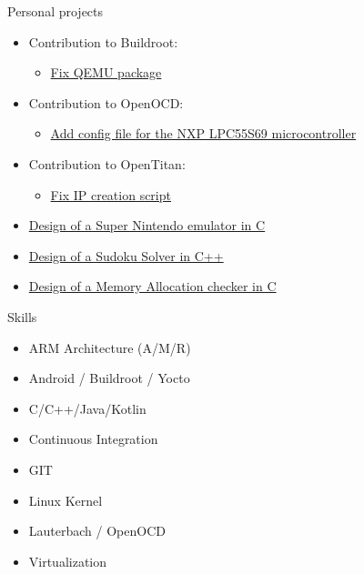 \documentclass[a4paper, 10pt]{article}
\begin{document}
\begin{unbreakableSection} {Personal projects}
\begin{projects}
\begin{itemize}[parsep=0cm,itemsep=0cm,topsep=0cm]
\begin{itemize}[parsep=0cm,itemsep=0cm,topsep=0cm]
			\end{itemize}
		\item Contribution to Buildroot:
			\begin{itemize}[parsep=0cm,itemsep=0cm,topsep=0cm]
				\item \href{https://git.busybox.net/buildroot/commit/?id=c2cdde4887500ca809ab52ff75d22afdb3c1168d}{Fix QEMU package}
			\end{itemize}
		\item Contribution to OpenOCD:
			\begin{itemize}[parsep=0cm,itemsep=0cm,topsep=0cm]
				\item \href{https://review.openocd.org/c/openocd/+/6787}{Add config file for the NXP LPC55S69 microcontroller}
			\end{itemize}
		\item Contribution to OpenTitan:
			\begin{itemize}[parsep=0cm,itemsep=0cm,topsep=0cm]
				\item \href{https://github.com/lowRISC/opentitan/pull/9251}{Fix IP creation script}
			\end{itemize}
	    \item \href{https://github.com/grassead/snesemu}{Design of a Super Nintendo emulator in C}
	    \item \href{https://github.com/grassead/sudokusolver}{Design of a Sudoku Solver in C++}
	    \item \href{https://github.com/grassead/memorychecker}{Design of a Memory Allocation checker in C}
	\end{itemize}
    \end{projects}
\end{unbreakableSection}

\begin{section} {Skills}
    \begin{skills}
	\begin{itemize}[parsep=0cm,itemsep=0cm,topsep=0cm]
	    \item ARM Architecture (A/M/R)
	    \item Android / Buildroot / Yocto
	    \item C/C++/Java/Kotlin
	    \item Continuous Integration
	    \item GIT
	    \item Linux Kernel
	    \item Lauterbach / OpenOCD
	    \item Virtualization
	\end{itemize}
    \end{skills}
\end{section}
\end{document}

